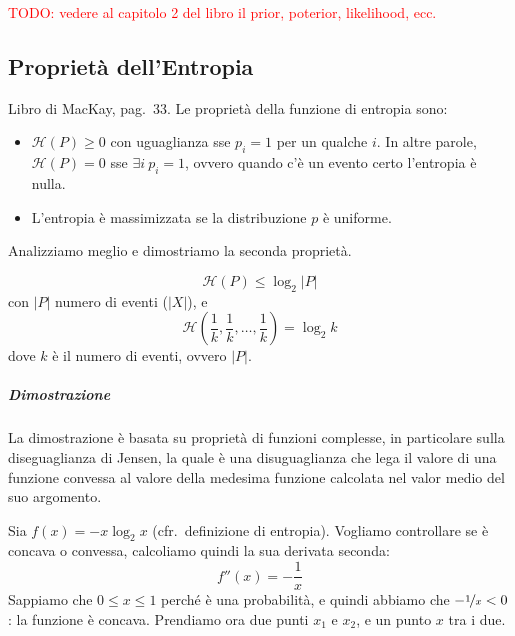 \textcolor{Red}{TODO: vedere al capitolo 2 del libro il prior, poterior, likelihood, ecc.}



\subsection{Proprietà dell'Entropia}
Libro di MacKay, pag.~33. Le proprietà della funzione di entropia sono:
\begin{itemize}
    \item $\mathcal{H}(P)\geq 0$ con uguaglianza sse $p_i=1$ per un qualche $i$. In altre parole, $\mathcal{H}(P)=0$ sse $\exists i ~p_i=1$, ovvero quando c'è un evento certo l'entropia è nulla.
    \item L'entropia è massimizzata se la distribuzione $p$ è uniforme.
\end{itemize}
Analizziamo meglio e dimostriamo la seconda proprietà.

\begin{property} 
    $$
        \mathcal{H}(P)\leq \log_2|P|
    $$
    con $|P|$ numero di eventi ($|X|$), e
    $$
        \mathcal{H}\left(\frac{1}{k},\frac{1}{k},\dots,\frac{1}{k}\right) = \log_2 k
    $$
    dove $k$ è il numero di eventi, ovvero $|P|$.
\end{property}

\subparagraph{Dimostrazione} La dimostrazione è basata su proprietà di funzioni complesse, in particolare sulla diseguaglianza di Jensen, la quale è una disuguaglianza che lega il valore di una funzione convessa al valore della medesima funzione calcolata nel valor medio del suo argomento.

Sia $f(x)=-x\log_2x$ (cfr.~definizione di entropia). Vogliamo controllare se è concava o convessa, calcoliamo quindi la sua derivata seconda:
$$
    f''(x) = -\frac{1}{x}
$$
Sappiamo che $0\leq x\leq 1$ perché è una probabilità, e quindi abbiamo che $-\nicefrac{1}{x}<0$: la funzione è con\-ca\-va. Prendiamo ora due punti $x_1$ e $x_2$, e un punto $x$ tra i due.

